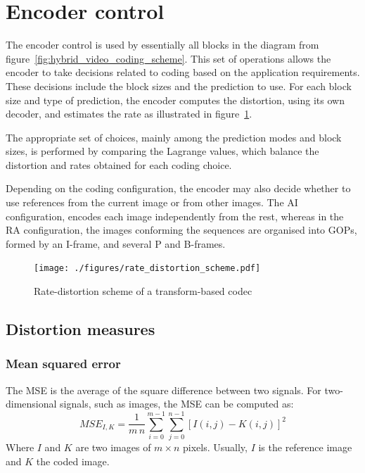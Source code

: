 \documentclass[11pt,a4paper,openright,twoside]{book}
\def\usepdfs{1} %
\numberwithin{equation}{section} %
\numberwithin{figure}{section} %
\numberwithin{table}{section} %
\begin{document}
\section{Encoder control}
\label{sec:encoder_control}

The encoder control is used by essentially all blocks in the diagram
from figure~\ref{fig:hybrid_video_coding_scheme}.
This set of operations allows the encoder to take decisions related to coding
based on the application requirements.
These decisions include the block sizes and the prediction to use.
For each block size and type of prediction, the encoder computes the
distortion, using its own decoder, and estimates the rate as illustrated in
figure~\ref{fig:rate_distortion_scheme}.

The appropriate set of choices, mainly among the prediction modes and block
sizes, is performed by comparing the Lagrange values, which balance the
distortion and rates obtained for each coding choice.

Depending on the coding configuration, the encoder may also decide whether to
use references from the current image or from other images.
The \ac{AI} configuration, encodes each image independently from the rest,
whereas in the \ac{RA} configuration, the images conforming the sequences are
organised into \acp{GOP}, formed by an I-frame, and several P and B-frames.

\begin{figure}[tb]
	\centering
	\ifthenelse{\usepdfs = 0}
	{}
	{\texttt{[image: ./figures/rate\_distortion\_scheme.pdf]}}
	\caption{Rate-distortion scheme of a transform-based codec}
	\label{fig:rate_distortion_scheme}
\end{figure}

\subsection{Distortion measures}
\label{sub:distortion_measures}

\subsubsection{Mean squared error}
\label{ssub:mean_squared_error}

The \ac{MSE} is the average of the square difference between two
signals.
For two-dimensional signals, such as images, the \ac{MSE} can be computed as:
\begin{equation}
	MSE_{I,K} = \frac{1}{m\,n} \sum\limits_{i=0}^{m-1} \sum\limits_{j=0}^{n-1}
	{\left[ I(i,j) - K(i,j) \right]} ^2
	\label{eqn:mse}
\end{equation}
Where $I$ and $K$ are two images of $m \times n$ pixels.
Usually, $I$ is the reference image and $K$ the coded image.
\end{document}
